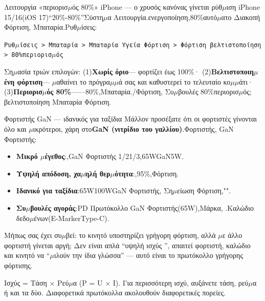 \begin{tcbinfo}{Λειτουργία «περιορισ$\mu$ός 80\%» iPhone — ο χρυσός κανόνας γίνεται ρύθ$\mu$ιση}
iPhone 15/16(iOS 17)“20\%-80\%”Σύστη$\mu$α Λειτουργία.ενεργοποίηση,80\%αυτό$\mu$ατο Διακοπή Φόρτιση, Μπαταρία.Ρυθ$\mu$ίσεις:

\texttt{Ρυθ$\mu$ίσεις > Μπαταρία > Μπαταρία Υγεία Φόρτιση > Φόρτιση βελτιστοποίηση > 80\%περιορισ$\mu$ός}

Ση$\mu$ασία τριών επιλογών: (1)\textbf{Χωρίς όριο}— φορτίζει έως 100\%· (2)\textbf{Βελτιστοποιη$\mu$ένη φόρτιση}— $\mu$αθαίνει το πρόγρα$\mu$$\mu$ά σας και καθυστερεί το τελευταίο κο$\mu$$\mu$άτι· (3)\textbf{Περιορισ$\mu$ός 80\%}——80\%,Μπαταρία./Φόρτιση, Συ$\mu$βουλές 80\%περιορισ$\mu$ός; βελτιστοποίηση Μπαταρία Φόρτιση.

\end{tcbinfo}

\begin{tcbinfo}{Φορτιστής GaN — ιδανικός για ταξίδια}
Μάλλον προσέξατε ότι οι φορτιστές γίνονται όλο και $\mu$ικρότεροι, χάρη στο\textbf{GaN (νιτρίδιο του γαλλίου)}.Φορτιστής, GaN Φορτιστής:

\begin{itemize}
  \item \textbf{Μικρό $\mu$έγεθος}:,GaN Φορτιστής 1/21/3,65WGaN5W.
  \item \textbf{Υψηλή απόδοση, χα$\mu$ηλή θερ$\mu$ότητα}:,95\%,Φόρτιση.
  \item \textbf{Ιδανικό για ταξίδια}:65W100WGaN Φορτιστής, Ση$\mu$είωση Φόρτιση,"".
  \item \textbf{Συ$\mu$βουλές αγοράς}:PD Πρωτόκολλο GaN Φορτιστής(65W),Μάρκα, .Καλώδιο δεδο$\mu$ένων(E-MarkerType-C).
\end{itemize}

\end{tcbinfo}


Μήπως σας έχει συ$\mu$βεί: το κινητό υποστηρίζει γρήγορη φόρτιση, αλλά $\mu$ε άλλο φορτιστή γίνεται αργή; Δεν είναι απλά “υψηλή ισχύς ”, απαιτεί φορτιστή, καλώδιο και κινητό να “$\mu$ιλούν την ίδια γλώσσα” — αυτό είναι το πρωτόκολλο γρήγορης φόρτισης.


Ισχύς = Τάση × Ρεύ$\mu$α (P = U × I). Για περισσότερη ισχύ, αυξάνετε τάση, ρεύ$\mu$α ή και τα δύο. Διαφορετικά πρωτόκολλα ακολουθούν διαφορετικές πορείες.

